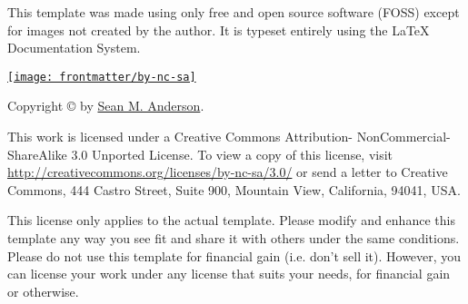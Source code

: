 \null
\vfill
\begin{flushleft}
This template was made using only free and open source software (FOSS) except for images not created by the author. It is typeset entirely using the \LaTeX{} Documentation System.
\vspace{0.7cm}

{\href{http://creativecommons.org/licenses/by-nc-sa/3.0/}{\texttt{[image: frontmatter/by-nc-sa]}}}

Copyright {\sffamily\copyright{}} \the\year{} by \href{http://www.roguephysicist.org}{Sean M. Anderson}.

This work is licensed under a Creative Commons Attribution- NonCommercial-ShareAlike 3.0 Unported License. To view a copy of this license, visit \url{http://creativecommons.org/licenses/by-nc-sa/3.0/} or send a letter to Creative Commons, 444 Castro Street, Suite 900, Mountain View, California, 94041, USA.

This license only applies to the actual template. Please modify and enhance this template any way you see fit and share it with others under the same conditions. Please do not use this template for financial gain (i.e. don't sell it). However, you can license your work under any license that suits your needs, for financial gain or otherwise.
\end{flushleft}
\clearpage
